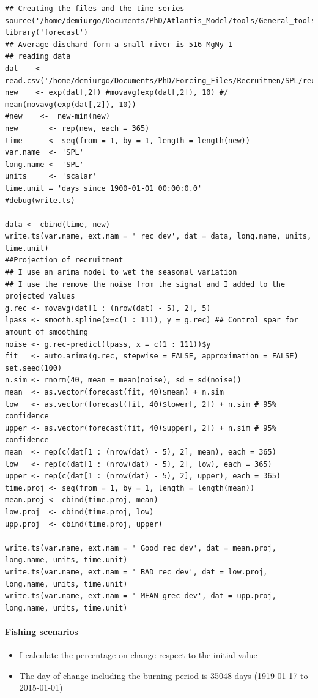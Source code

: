\documentclass[11pt]{article}
\begin{document}
\begin{verbatim}
## Creating the files and the time series
source('/home/demiurgo/Documents/PhD/Atlantis_Model/tools/General_tools/Atlantis_tools.R')
library('forecast')
## Average dischard form a small river is 516 MgNy-1
## reading data
dat    <- read.csv('/home/demiurgo/Documents/PhD/Forcing_Files/Recruitmen/SPL/rec.csv')
new    <- exp(dat[,2]) #movavg(exp(dat[,2]), 10) #/ mean(movavg(exp(dat[,2]), 10))
#new    <-  new-min(new)
new       <- rep(new, each = 365)
time      <- seq(from = 1, by = 1, length = length(new))
var.name  <- 'SPL'
long.name <- 'SPL'
units     <- 'scalar'
time.unit = 'days since 1900-01-01 00:00:0.0'
#debug(write.ts)

data <- cbind(time, new)
write.ts(var.name, ext.nam = '_rec_dev', dat = data, long.name, units, time.unit)
##Projection of recruitment
## I use an arima model to wet the seasonal variation
## I use the remove the noise from the signal and I added to the projected values
g.rec <- movavg(dat[1 : (nrow(dat) - 5), 2], 5)
lpass <- smooth.spline(x=c(1 : 111), y = g.rec) ## Control spar for amount of smoothing
noise <- g.rec-predict(lpass, x = c(1 : 111))$y
fit   <- auto.arima(g.rec, stepwise = FALSE, approximation = FALSE)
set.seed(100)
n.sim <- rnorm(40, mean = mean(noise), sd = sd(noise))
mean  <- as.vector(forecast(fit, 40)$mean) + n.sim
low   <- as.vector(forecast(fit, 40)$lower[, 2]) + n.sim # 95% confidence
upper <- as.vector(forecast(fit, 40)$upper[, 2]) + n.sim # 95% confidence
mean  <- rep(c(dat[1 : (nrow(dat) - 5), 2], mean), each = 365)
low   <- rep(c(dat[1 : (nrow(dat) - 5), 2], low), each = 365)
upper <- rep(c(dat[1 : (nrow(dat) - 5), 2], upper), each = 365)
time.proj <- seq(from = 1, by = 1, length = length(mean))
mean.proj <- cbind(time.proj, mean)
low.proj  <- cbind(time.proj, low)
upp.proj  <- cbind(time.proj, upper)

write.ts(var.name, ext.nam = '_Good_rec_dev', dat = mean.proj, long.name, units, time.unit)
write.ts(var.name, ext.nam = '_BAD_rec_dev', dat = low.proj, long.name, units, time.unit)
write.ts(var.name, ext.nam = '_MEAN_grec_dev', dat = upp.proj, long.name, units, time.unit)
\end{verbatim}
\paragraph*{Fishing scenarios}
\label{sec-6-2-2}

\begin{itemize}
\item I calculate the percentage on change respect to the initial value
\item The day of change including the burning period is 35048 days (1919-01-17 to 2015-01-01)
\end{itemize}
\end{document}
